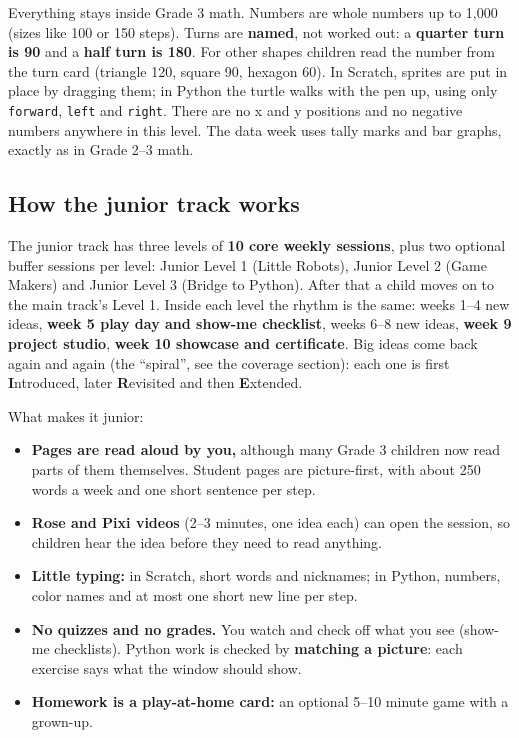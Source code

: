 \documentclass[track=junior,level=3,teacher]{kidscode}
\begin{document}
\begin{teachernote}
Everything stays inside Grade 3 math. Numbers are whole numbers up to 1,000 (sizes like 100 or 150
steps). Turns are \textbf{named}, not worked out: a \textbf{quarter turn is 90} and a \textbf{half turn
is 180}. For other shapes children read the number from the turn card (triangle 120, square 90,
hexagon 60). In Scratch, sprites are put in place by dragging them; in Python the turtle walks with
the pen up, using only \texttt{forward}, \texttt{left} and \texttt{right}. There are no x and y
positions and no negative numbers anywhere in this level. The data week uses tally marks and bar
graphs, exactly as in Grade 2--3 math.
\end{teachernote}

\subsection{How the junior track works}
The junior track has three levels of \textbf{10 core weekly sessions}, plus two optional buffer
sessions per level: Junior Level 1 (Little Robots), Junior Level 2 (Game Makers) and Junior Level 3
(Bridge to Python). After that a child moves on to the main track's Level 1. Inside each level the
rhythm is the same: weeks 1--4 new ideas, \textbf{week 5 play day and show-me checklist}, weeks 6--8
new ideas, \textbf{week 9 project studio}, \textbf{week 10 showcase and certificate}. Big ideas come
back again and again (the \enquote{spiral}, see the coverage section): each one is first
\textbf{I}ntroduced, later \textbf{R}evisited and then \textbf{E}xtended.

What makes it junior:
\begin{itemize}[itemsep=2pt]
  \item \textbf{Pages are read aloud by you,} although many Grade 3 children now read parts of them
        themselves. Student pages are picture-first, with about 250 words a week and one short sentence per step.
  \item \textbf{Rose and Pixi videos} (2--3 minutes, one idea each) can open the session, so children
        hear the idea before they need to read anything.
  \item \textbf{Little typing:} in Scratch, short words and nicknames; in Python, numbers, color names
        and at most one short new line per step.
  \item \textbf{No quizzes and no grades.} You watch and check off what you see (show-me checklists).
        Python work is checked by \textbf{matching a picture}: each exercise says what the window should show.
  \item \textbf{Homework is a play-at-home card:} an optional 5--10 minute game with a grown-up.
\end{itemize}
\end{document}
